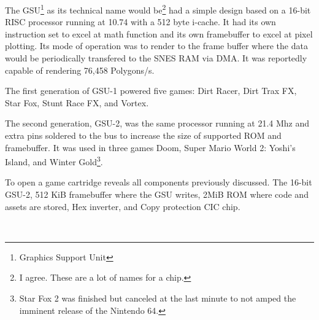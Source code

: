 \par
The GSU\footnote{Graphics Support Unit} as its technical name would be\footnote{I agree. These are a lot of names for a chip.} had a simple design based on a 16-bit RISC processor running at 10.74 with a 512 byte i-cache. It had its own instruction set to excel at math function and its own framebuffer to excel at pixel plotting. Its mode of operation was to render to the frame buffer where the data would be periodically transfered to the SNES RAM via DMA. It was reportedly capable of rendering 76,458 Polygons/s.\\

\par
The first generation of GSU-1 powered five games: Dirt Racer, Dirt Trax FX, Star Fox, Stunt Race FX, and Vortex.\\
\par
 The second generation, GSU-2, was the same processor running at 21.4 Mhz and extra pins soldered to the bus to increase the size of supported ROM and framebuffer. It was used in three games Doom, Super Mario World 2: Yoshi's Island, and Winter Gold\footnote{Star Fox 2 was finished but canceled at the last minute to not amped the imminent release of the Nintendo 64.}.\\
\par
To open a \doom game cartridge reveals all components previously discussed.  The 16-bit GSU-2,  512 KiB framebuffer where the GSU writes,  2MiB ROM where code and assets are stored,  Hex inverter, and  Copy protection CIC chip.







\\
\par

